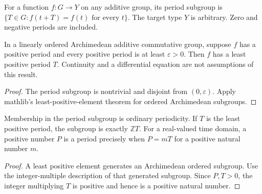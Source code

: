 \begin{definition}
\label{def:period-subgroup}
\leanok
For a function $f:G\to Y$ on any additive group, its period subgroup is
$\{T\in G: f(t+T)=f(t)\text{ for every }t\}$.
The target type $Y$ is arbitrary. Zero and negative periods are included.
\end{definition}

\begin{proposition}
\label{prop:least-period-gap}
\leanok
{}
In a linearly ordered Archimedean additive commutative group, suppose $f$
has a positive period and every positive period is at least $\varepsilon>0$.
Then $f$ has a least positive period $T$.
Continuity and a differential equation are not assumptions of this result.
\end{proposition}
\begin{proof}
\leanok
The period subgroup is nontrivial and disjoint from $(0,\varepsilon)$.
Apply mathlib's least-positive-element theorem for ordered Archimedean
subgroups.
\end{proof}

\begin{lemma}
\label{lem:period-classification}
\leanok
{}
Membership in the period subgroup is ordinary periodicity. If $T$ is
the least positive period, the subgroup is exactly $\mathbb ZT$.
For a real-valued time domain, a positive number $P$ is a period precisely
when $P=mT$ for a positive natural number $m$.
\end{lemma}
\begin{proof}
\leanok
A least positive element generates an Archimedean ordered subgroup.
Use the integer-multiple description of that generated subgroup.
Since $P,T>0$, the integer multiplying $T$ is positive and hence is a
positive natural number.
\end{proof}

